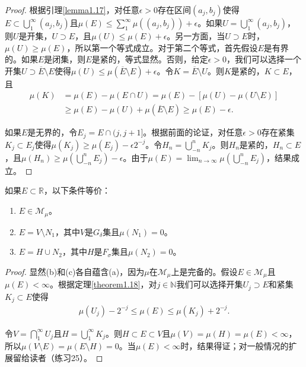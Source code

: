 \documentclass[lang=cn,10pt,thmcnt=section]{elegantbook}
\begin{document}
\begin{proof}
根据引理\ref{lemma1.17}，对任意$\epsilon > 0$存在区间$(a_j, b_j)$使得$E \subset \bigcup_{1}^{\infty}(a_j, b_j)$且$\mu(E) \leq \sum_{1}^{\infty} \mu((a_j, b_j)) + \epsilon$。如果$U = \bigcup_{1}^{\infty}(a_j, b_j)$，则$U$是开集，$U \supset E$，且$\mu(U) \leq \mu(E) + \epsilon$。另一方面，当$U \supset E$时，$\mu(U) \geq \mu(E)$，所以第一个等式成立。对于第二个等式，首先假设$E$是有界的。如果$E$是闭集，则$E$是紧的，等式显然。否则，给定$\epsilon > 0$，我们可以选择一个开集$U \supset \overline{E} \setminus E$使得$\mu(U) \leq \mu(\overline{E} \setminus E) + \epsilon$。令$K = \overline{E} \setminus U$。则$K$是紧的，$K \subset E$，且
\begin{align}
\mu(K) &= \mu(E) - \mu(E \cap U) = \mu(E) - [\mu(U) - \mu(U \setminus E)] \\
&\geq \mu(E) - \mu(U) + \mu(\overline{E} \setminus E) \geq \mu(E) - \epsilon.
\end{align}

如果$E$是无界的，令$E_j = E \cap (j, j + 1]$。根据前面的论证，对任意$\epsilon > 0$存在紧集$K_j \subset E_j$使得$\mu(K_j) \geq \mu(E_j) - \epsilon 2^{-j}$。令$H_n = \bigcup_{-n}^{n} K_j$。则$H_n$是紧的，$H_n \subset E$，且$\mu(H_n) \geq \mu\left(\bigcup_{-n}^{n} E_j\right) - \epsilon$。由于$\mu(E) = \lim_{n\to\infty} \mu\left(\bigcup_{-n}^{n} E_j\right)$，结果成立。
\end{proof}

\begin{theorem}\label{theorem1.19}
如果$E \subset \mathbb{R}$，以下条件等价：
\begin{enumerate}[label=\alph*.]
\item $E \in \mathcal{M}_{\mu}$。
\item $E = V \setminus N_1$，其中$V$是$G_{\delta}$集且$\mu(N_1) = 0$。
\item $E = H \cup N_2$，其中$H$是$F_{\sigma}$集且$\mu(N_2) = 0$。
\end{enumerate}
\end{theorem}

\begin{proof}
显然(b)和(c)各自蕴含(a)，因为$\mu$在$\mathcal{M}_{\mu}$上是完备的。假设$E \in \mathcal{M}_{\mu}$且$\mu(E) < \infty$。根据定理\ref{theorem1.18}，对$j \in \mathbb{N}$我们可以选择开集$U_j \supset E$和紧集$K_j \subset E$使得
\begin{align}
\mu(U_j) - 2^{-j} \leq \mu(E) \leq \mu(K_j) + 2^{-j}.
\end{align}

令$V = \bigcap_{1}^{\infty} U_j$且$H = \bigcup_{1}^{\infty} K_j$。则$H \subset E \subset V$且$\mu(V) = \mu(H) = \mu(E) < \infty$，所以$\mu(V \setminus E) = \mu(E \setminus H) = 0$。当$\mu(E) < \infty$时，结果得证；对一般情况的扩展留给读者（练习25）。
\end{proof}
\end{document}

